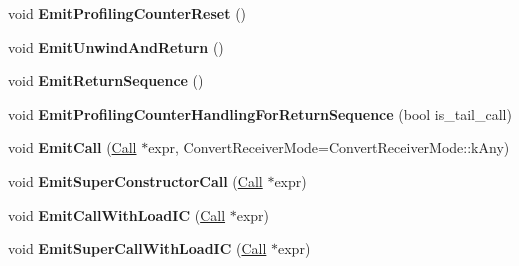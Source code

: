 \begin{DoxyCompactItemize}
\item 
void {\bfseries Emit\+Profiling\+Counter\+Reset} ()\hypertarget{classv8_1_1internal_1_1_full_code_generator_a4bc3cd1fb861b0dabd4f1be50746131b}{}\label{classv8_1_1internal_1_1_full_code_generator_a4bc3cd1fb861b0dabd4f1be50746131b}

\item 
void {\bfseries Emit\+Unwind\+And\+Return} ()\hypertarget{classv8_1_1internal_1_1_full_code_generator_a25f8716d947d7f655b5765344dc7e5a9}{}\label{classv8_1_1internal_1_1_full_code_generator_a25f8716d947d7f655b5765344dc7e5a9}

\item 
void {\bfseries Emit\+Return\+Sequence} ()\hypertarget{classv8_1_1internal_1_1_full_code_generator_a399467198838063ae758ab57576983fd}{}\label{classv8_1_1internal_1_1_full_code_generator_a399467198838063ae758ab57576983fd}

\item 
void {\bfseries Emit\+Profiling\+Counter\+Handling\+For\+Return\+Sequence} (bool is\+\_\+tail\+\_\+call)\hypertarget{classv8_1_1internal_1_1_full_code_generator_a7f627de81b82902450811c87d73bc79e}{}\label{classv8_1_1internal_1_1_full_code_generator_a7f627de81b82902450811c87d73bc79e}

\item 
void {\bfseries Emit\+Call} (\hyperlink{classv8_1_1internal_1_1_call}{Call} $\ast$expr, Convert\+Receiver\+Mode=Convert\+Receiver\+Mode\+::k\+Any)\hypertarget{classv8_1_1internal_1_1_full_code_generator_a0fe168137017015b3bb5577857052669}{}\label{classv8_1_1internal_1_1_full_code_generator_a0fe168137017015b3bb5577857052669}

\item 
void {\bfseries Emit\+Super\+Constructor\+Call} (\hyperlink{classv8_1_1internal_1_1_call}{Call} $\ast$expr)\hypertarget{classv8_1_1internal_1_1_full_code_generator_a1245e312eda37f00d35745410182199e}{}\label{classv8_1_1internal_1_1_full_code_generator_a1245e312eda37f00d35745410182199e}

\item 
void {\bfseries Emit\+Call\+With\+Load\+IC} (\hyperlink{classv8_1_1internal_1_1_call}{Call} $\ast$expr)\hypertarget{classv8_1_1internal_1_1_full_code_generator_aba475671ff66d0bdf85e6c7c37336c50}{}\label{classv8_1_1internal_1_1_full_code_generator_aba475671ff66d0bdf85e6c7c37336c50}

\item 
void {\bfseries Emit\+Super\+Call\+With\+Load\+IC} (\hyperlink{classv8_1_1internal_1_1_call}{Call} $\ast$expr)\hypertarget{classv8_1_1internal_1_1_full_code_generator_ad23ae565b6f11493817b4f2dd76ef047}{}\label{classv8_1_1internal_1_1_full_code_generator_ad23ae565b6f11493817b4f2dd76ef047}


\end{DoxyCompactItemize}
